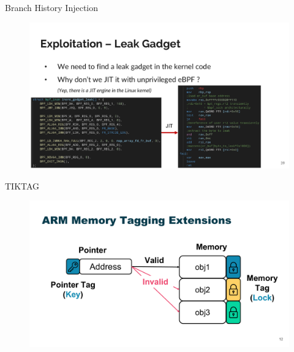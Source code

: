 \documentclass{beamer}
\begin{document}
\begin{frame}{Branch History Injection\cite{bhi}}
    \begin{figure}
        \begin{center}
            \includegraphics[width=1\textwidth]{img/ebpf.pdf}
        \end{center}
    \end{figure} 
\end{frame}

\begin{frame}{TIKTAG\cite{tiktag}}
    \begin{figure}
        \begin{center}
            \includegraphics[width=1\textwidth]{img/mte.pdf}
        \end{center}
    \end{figure} 
\end{frame}
\end{document}
